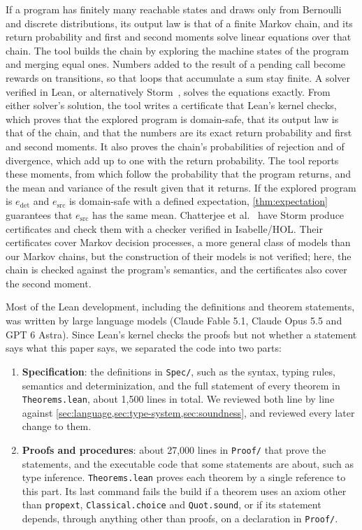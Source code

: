 If a program has finitely many reachable states and draws only from Bernoulli and discrete distributions, its output law is that of a finite Markov chain, and its return probability and first and second moments solve linear equations over that chain. The tool builds the chain by exploring the machine states of the program and merging equal ones. Numbers added to the result of a pending call become rewards on transitions, so that loops that accumulate a sum stay finite. A solver verified in Lean, or alternatively Storm~\cite{hensel2022storm}, solves the equations exactly. From either solver's solution, the tool writes a certificate that Lean's kernel checks, which proves that the explored program is domain-safe, that its output law is that of the chain, and that the numbers are its exact return probability and first and second moments. It also proves the chain's probabilities of rejection and of divergence, which add up to one with the return probability. The tool reports these moments, from which follow the probability that the program returns, and the mean and variance of the result given that it returns. If the explored program is $e_{\mathrm{det}}$ and $e_{\mathrm{src}}$ is domain-safe with a defined expectation, \cref{thm:expectation} guarantees that $e_{\mathrm{src}}$ has the same mean. Chatterjee et al.~\cite{chatterjee2025certificates} have Storm produce certificates and check them with a checker verified in Isabelle/HOL. Their certificates cover Markov decision processes, a more general class of models than our Markov chains, but the construction of their models is not verified; here, the chain is checked against the program's semantics, and the certificates also cover the second moment.

Most of the Lean development, including the definitions and theorem statements, was written by large language models (Claude Fable 5.1, Claude Opus 5.5 and GPT 6 Astra). Since Lean's kernel checks the proofs but not whether a statement says what this paper says, we separated the code into two parts:

\begin{enumerate}
\item \textbf{Specification}: the definitions in \texttt{Spec/}, such as the syntax, typing rules, semantics and determinization, and the full statement of every theorem in \texttt{Theorems.lean}, about 1,500 lines in total. We reviewed both line by line against \cref{sec:language,sec:type-system,sec:soundness}, and reviewed every later change to them.
\item \textbf{Proofs and procedures}: about 27,000 lines in \texttt{Proof/} that prove the statements, and the executable code that some statements are about, such as type inference. \texttt{Theorems.lean} proves each theorem by a single reference to this part. Its last command fails the build if a theorem uses an axiom other than \texttt{propext}, \texttt{Classical.choice} and \texttt{Quot.sound}, or if its statement depends, through anything other than proofs, on a declaration in \texttt{Proof/}.
\end{enumerate}

